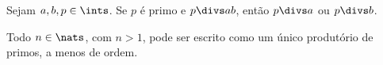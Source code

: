 \begin{exercise}
    Sejam $a, b, p \in \ints$. Se $p$ é primo e $p \divs ab$, então $p \divs a$
    ou $p \divs b$.
\end{exercise}

\begin{exercise}
    Todo $n \in \nats$, com $n > 1$, pode ser escrito como um único produtório
    de primos, a menos de ordem.
\end{exercise}
